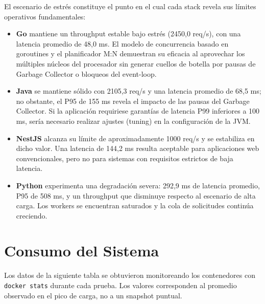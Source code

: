\documentclass[12pt,a4paper]{article}
\begin{document}
El escenario de estrés constituye el punto en el cual cada stack revela sus límites operativos fundamentales:

\begin{itemize}
    \item \textbf{Go} mantiene un throughput estable bajo estrés (2450,0 req/s), con una latencia promedio de 48,0 ms. El modelo de concurrencia basado en goroutines y el planificador M:N demuestran su eficacia al aprovechar los múltiples núcleos del procesador sin generar cuellos de botella por pausas de Garbage Collector o bloqueos del event-loop.
    \item \textbf{Java} se mantiene sólido con 2105,3 req/s y una latencia promedio de 68,5 ms; no obstante, el P95 de 155 ms revela el impacto de las pausas del Garbage Collector. Si la aplicación requiriese garantías de latencia P99 inferiores a 100 ms, sería necesario realizar ajustes (tuning) en la configuración de la JVM.
    \item \textbf{NestJS} alcanza su límite de aproximadamente 1000 req/s y se estabiliza en dicho valor. Una latencia de 144,2 ms resulta aceptable para aplicaciones web convencionales, pero no para sistemas con requisitos estrictos de baja latencia.
    \item \textbf{Python} experimenta una degradación severa: 292,9 ms de latencia promedio, P95 de 508 ms, y un throughput que disminuye respecto al escenario de alta carga. Los workers se encuentran saturados y la cola de solicitudes continúa creciendo.
\end{itemize}

\newpage

\section{Consumo del Sistema}

Los datos de la siguiente tabla se obtuvieron monitoreando los contenedores con \texttt{docker stats} durante cada prueba. Los valores corresponden al promedio observado en el pico de carga, no a un snapshot puntual.
\end{document}

